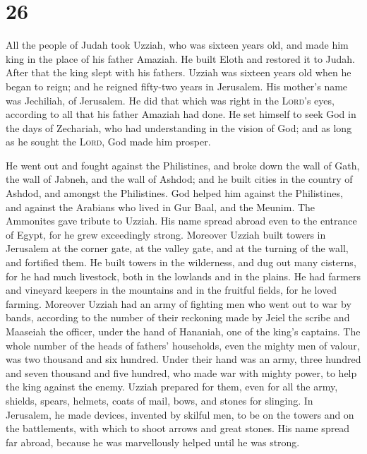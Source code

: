 \hypertarget{section-25}{%
\section{26}\label{section-25}}

 All the people of Judah took Uzziah, who was sixteen
years old, and made him king in the place of his father Amaziah.
 He built Eloth and restored it to Judah. After that the
king slept with his fathers.  Uzziah was sixteen years old
when he began to reign; and he reigned fifty-two years in Jerusalem. His
mother's name was Jechiliah, of Jerusalem.  He did that
which was right in the \textsc{Lord}'s eyes, according to all that his
father Amaziah had done.  He set himself to seek God in
the days of Zechariah, who had understanding in the vision of God; and
as long as he sought the \textsc{Lord}, God made him prosper.

 He went out and fought against the Philistines, and broke
down the wall of Gath, the wall of Jabneh, and the wall of Ashdod; and
he built cities in the country of Ashdod, and amongst the Philistines.
 God helped him against the Philistines, and against the
Arabians who lived in Gur Baal, and the Meunim.  The
Ammonites gave tribute to Uzziah. His name spread abroad even to the
entrance of Egypt, for he grew exceedingly strong. 
Moreover Uzziah built towers in Jerusalem at the corner gate, at the
valley gate, and at the turning of the wall, and fortified them.
 He built towers in the wilderness, and dug out many
cisterns, for he had much livestock, both in the lowlands and in the
plains. He had farmers and vineyard keepers in the mountains and in the
fruitful fields, for he loved farming.  Moreover Uzziah
had an army of fighting men who went out to war by bands, according to
the number of their reckoning made by Jeiel the scribe and Maaseiah the
officer, under the hand of Hananiah, one of the king's captains.
 The whole number of the heads of fathers' households,
even the mighty men of valour, was two thousand and six hundred.
 Under their hand was an army, three hundred and seven
thousand and five hundred, who made war with mighty power, to help the
king against the enemy.  Uzziah prepared for them, even
for all the army, shields, spears, helmets, coats of mail, bows, and
stones for slinging.  In Jerusalem, he made devices,
invented by skilful men, to be on the towers and on the battlements,
with which to shoot arrows and great stones. His name spread far abroad,
because he was marvellously helped until he was strong.

